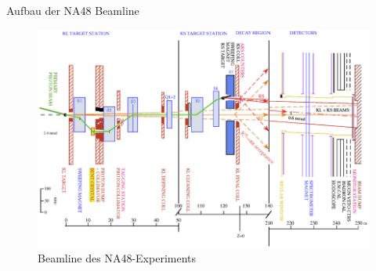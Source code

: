 \documentclass[aspectratio=1610, professionalfonts, 9pt, t]{beamer}
\begin{document}
  \begin{frame}{Aufbau der NA48 Beamline}
    \begin{figure}[ht]
      \includegraphics[height=0.95\textheight]{Images/na48quer.png}
      \caption{Beamline des NA48-Experiments}%
    \end{figure}
  \end{frame}

\end{document}
